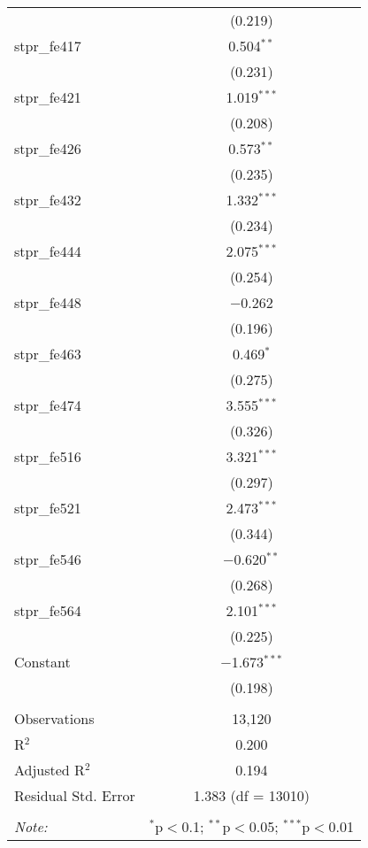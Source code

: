 \begin{table}[!htbp]
\begin{tabular}{@{\extracolsep{5pt}}lc}
  & (0.219) \\ 
  stpr\_fe417 & 0.504$^{**}$ \\ 
  & (0.231) \\ 
  stpr\_fe421 & 1.019$^{***}$ \\ 
  & (0.208) \\ 
  stpr\_fe426 & 0.573$^{**}$ \\ 
  & (0.235) \\ 
  stpr\_fe432 & 1.332$^{***}$ \\ 
  & (0.234) \\ 
  stpr\_fe444 & 2.075$^{***}$ \\ 
  & (0.254) \\ 
  stpr\_fe448 & $-$0.262 \\ 
  & (0.196) \\ 
  stpr\_fe463 & 0.469$^{*}$ \\ 
  & (0.275) \\ 
  stpr\_fe474 & 3.555$^{***}$ \\ 
  & (0.326) \\ 
  stpr\_fe516 & 3.321$^{***}$ \\ 
  & (0.297) \\ 
  stpr\_fe521 & 2.473$^{***}$ \\ 
  & (0.344) \\ 
  stpr\_fe546 & $-$0.620$^{**}$ \\ 
  & (0.268) \\ 
  stpr\_fe564 & 2.101$^{***}$ \\ 
  & (0.225) \\ 
  Constant & $-$1.673$^{***}$ \\ 
  & (0.198) \\ 
 \hline \\[-1.8ex] 
Observations & 13,120 \\ 
R$^{2}$ & 0.200 \\ 
Adjusted R$^{2}$ & 0.194 \\ 
Residual Std. Error & 1.383 (df = 13010) \\ 
\hline 
\hline \\[-1.8ex] 
\textit{Note:}  & \multicolumn{1}{r}{$^{*}$p$<$0.1; $^{**}$p$<$0.05; $^{***}$p$<$0.01} \\ 
\end{tabular} 
\end{table} 
